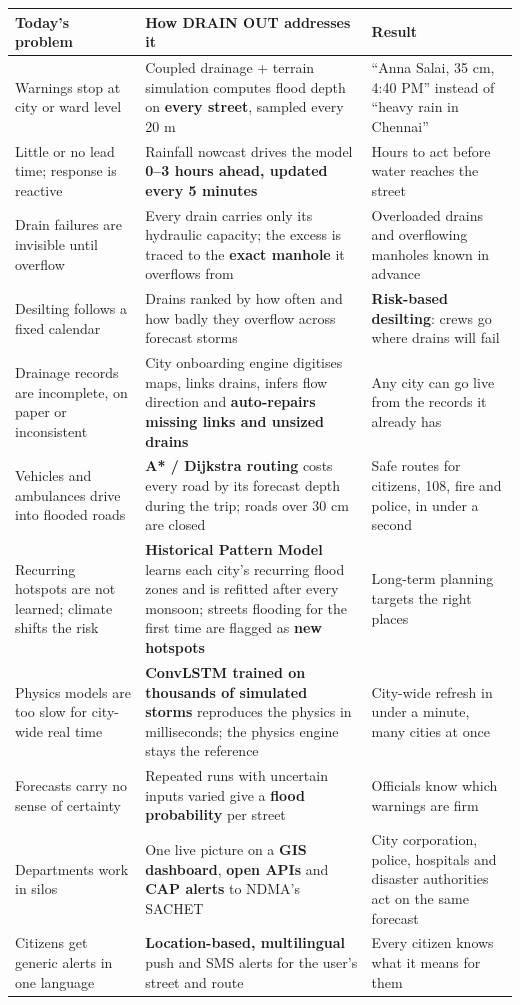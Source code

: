 \documentclass[11pt,a4paper]{article}
\begin{document}
{\small
\begin{longtable}{@{}p{3.9cm}p{7.6cm}p{4.5cm}@{}}
\toprule
\textbf{Today's problem} & \textbf{How DRAIN OUT addresses it} & \textbf{Result}\\
\midrule\endhead
Warnings stop at city or ward level &
  Coupled drainage + terrain simulation computes flood depth on \textbf{every street},
  sampled every 20 m &
  ``Anna Salai, 35 cm, 4:40 PM'' instead of ``heavy rain in Chennai''\\
Little or no lead time; response is reactive &
  Rainfall nowcast drives the model \textbf{0--3 hours ahead, updated every 5 minutes} &
  Hours to act before water reaches the street\\
Drain failures are invisible until overflow &
  Every drain carries only its hydraulic capacity; the excess is traced to the
  \textbf{exact manhole} it overflows from &
  Overloaded drains and overflowing manholes known in advance\\
Desilting follows a fixed calendar &
  Drains ranked by how often and how badly they overflow across forecast storms &
  \textbf{Risk-based desilting}: crews go where drains will fail\\
Drainage records are incomplete, on paper or inconsistent &
  City onboarding engine digitises maps, links drains, infers flow direction and
  \textbf{auto-repairs missing links and unsized drains} &
  Any city can go live from the records it already has\\
Vehicles and ambulances drive into flooded roads &
  \textbf{A* / Dijkstra routing} costs every road by its forecast depth during the trip;
  roads over 30 cm are closed &
  Safe routes for citizens, 108, fire and police, in under a second\\
Recurring hotspots are not learned; climate shifts the risk &
  \textbf{Historical Pattern Model} learns each city's recurring flood zones and is
  refitted after every monsoon; streets flooding for the first time are flagged as
  \textbf{new hotspots} &
  Long-term planning targets the right places\\
Physics models are too slow for city-wide real time &
  \textbf{ConvLSTM trained on thousands of simulated storms} reproduces the physics in
  milliseconds; the physics engine stays the reference &
  City-wide refresh in under a minute, many cities at once\\
Forecasts carry no sense of certainty &
  Repeated runs with uncertain inputs varied give a \textbf{flood probability} per street &
  Officials know which warnings are firm\\
Departments work in silos &
  One live picture on a \textbf{GIS dashboard}, \textbf{open APIs} and \textbf{CAP alerts}
  to NDMA's SACHET &
  City corporation, police, hospitals and disaster authorities act on the same forecast\\
Citizens get generic alerts in one language &
  \textbf{Location-based, multilingual} push and SMS alerts for the user's street and route &
  Every citizen knows what it means for them\\
\bottomrule
\end{longtable}}
\end{document}
